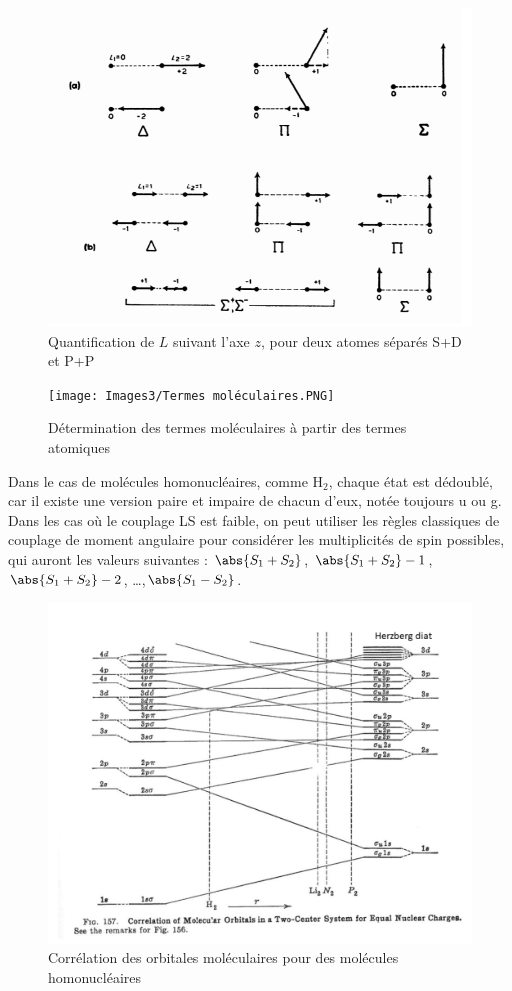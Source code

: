 \begin{figure}[tpb]
    \centering
    \includegraphics[scale=0.75]{Images3/quantification de L.PNG}
    \caption{Quantification de $L$ suivant l'axe $z$, pour deux atomes séparés S+D et P+P}
    \label{fig:quantification de L}
\end{figure}
\begin{figure}[tpb]
    \centering
    \texttt{[image: Images3/Termes moléculaires.PNG]}
    \caption{Détermination des termes moléculaires à partir des termes atomiques}
    \label{fig:termes mol}
\end{figure}
Dans le cas de molécules homonucléaires, comme H$_2$, chaque état est dédoublé, car il existe une version paire et impaire de chacun d'eux, notée toujours u ou g.
Dans les cas où le couplage LS est faible, on peut utiliser les règles classiques de couplage de moment angulaire
pour considérer les multiplicités de spin possibles, qui auront les valeurs suivantes : $\abs{S_1+S_2}$, $\abs{S_1+S_2}-1$, $\abs{S_1+S_2}-2$, \dots,$\abs{S_1-S_2}$.
\begin{figure}[htpb]
    \centering
    \includegraphics[scale=0.65]{Images3/Corrélation homonucléaire.png}
    \caption{Corrélation des orbitales moléculaires pour des molécules homonucléaires}
\end{figure}
